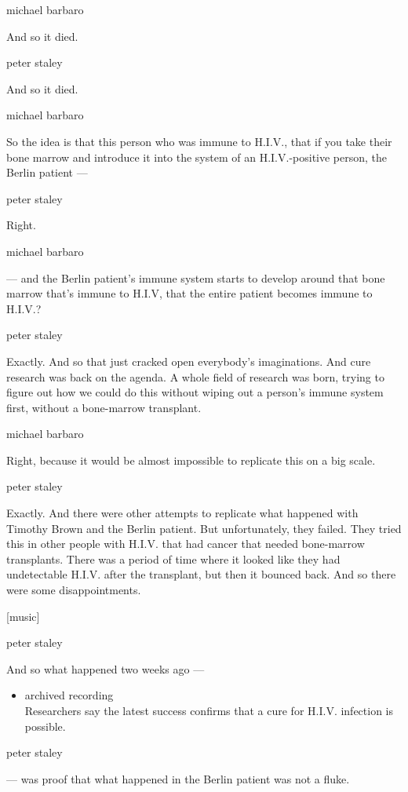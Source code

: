 michael barbaro

And so it died.

peter staley

And so it died.

michael barbaro

So the idea is that this person who was immune to H.I.V., that if you
take their bone marrow and introduce it into the system of an
H.I.V.-positive person, the Berlin patient ---

peter staley

Right.

michael barbaro

--- and the Berlin patient's immune system starts to develop around that
bone marrow that's immune to H.I.V, that the entire patient becomes
immune to H.I.V.?

peter staley

Exactly. And so that just cracked open everybody's imaginations. And
cure research was back on the agenda. A whole field of research was
born, trying to figure out how we could do this without wiping out a
person's immune system first, without a bone-marrow transplant.

michael barbaro

Right, because it would be almost impossible to replicate this on a big
scale.

peter staley

Exactly. And there were other attempts to replicate what happened with
Timothy Brown and the Berlin patient. But unfortunately, they failed.
They tried this in other people with H.I.V. that had cancer that needed
bone-marrow transplants. There was a period of time where it looked like
they had undetectable H.I.V. after the transplant, but then it bounced
back. And so there were some disappointments.

{[}music{]}

peter staley

And so what happened two weeks ago ---

\begin{itemize}
\tightlist
\item
  archived recording\\
  Researchers say the latest success confirms that a cure for H.I.V.
  infection is possible.
\end{itemize}

peter staley

--- was proof that what happened in the Berlin patient was not a fluke.

